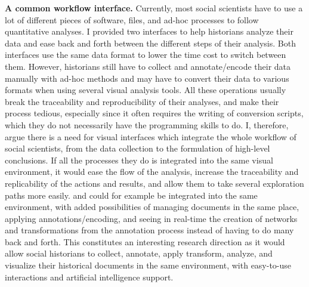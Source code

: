 \noindent\textbf{A common workflow interface.} Currently, most social scientists have to use a lot of different pieces of software, files, and ad-hoc processes to follow quantitative analyses.
I provided two \va interfaces to help historians analyze their data and ease back and forth between the different steps of their analysis.
Both interfaces use the same data format to lower the time cost to switch between them.
However, historians still have to collect and annotate/encode their data manually with ad-hoc methods and may have to convert their data to various formats when using several visual analysis tools.
All these operations usually break the traceability and reproducibility of their analyses, and make their process tedious, especially since it often requires the writing of conversion scripts, which they do not necessarily have the programming skills to do.
I, therefore, argue there is a need for visual interfaces which integrate the whole workflow of social scientists, from the data collection to the formulation of high-level conclusions.
If all the processes they do is integrated into the same visual environment, it would ease the flow of the analysis, increase the traceability and replicability of the actions and results, and allow them to take several exploration paths more easily.
\combinet and \pkclustering could for example be integrated into the same environment, with added possibilities of managing documents in the same place, applying annotations/encoding, and seeing in real-time the creation of networks and transformations from the annotation process instead of having to do many back and forth.
This constitutes an interesting research direction as it would allow social historians to collect, annotate, apply transform, analyze, and visualize their historical documents in the same environment, with easy-to-use interactions and artificial intelligence support.





